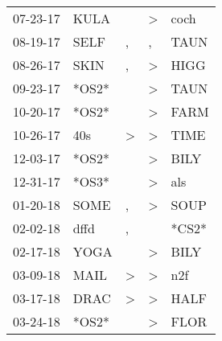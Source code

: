 \begin{supertabular}{p{0.07\textwidth}p{0.06\textwidth}p{0.02\textwidth}p{0.02\textwidth}p{0.06\textwidth}}
          07-23-17\textsuperscript{} &           KULA\textsuperscript{} &                  &     \textgreater &           coch\textsuperscript{} \\
          08-19-17\textsuperscript{} &           SELF\textsuperscript{} &                , &                , &           TAUN\textsuperscript{} \\
          08-26-17\textsuperscript{} &           SKIN\textsuperscript{} &                , &     \textgreater &           HIGG\textsuperscript{} \\
          09-23-17\textsuperscript{} &                            *OS2* &                  &     \textgreater &           TAUN\textsuperscript{} \\
          10-20-17\textsuperscript{} &                            *OS2* &                  &     \textgreater &           FARM\textsuperscript{} \\
          10-26-17\textsuperscript{} &            40s\textsuperscript{} &     \textgreater &     \textgreater &           TIME\textsuperscript{} \\
          12-03-17\textsuperscript{} &                            *OS2* &                  &     \textgreater &           BILY\textsuperscript{} \\
          12-31-17\textsuperscript{} &                            *OS3* &                  &     \textgreater &            als\textsuperscript{} \\
          01-20-18\textsuperscript{} &           SOME\textsuperscript{} &                , &     \textgreater &           SOUP\textsuperscript{} \\
          02-02-18\textsuperscript{} &           dffd\textsuperscript{} &                , &                  &                            *CS2* \\
          02-17-18\textsuperscript{} &           YOGA\textsuperscript{} &                  &     \textgreater &           BILY\textsuperscript{} \\
          03-09-18\textsuperscript{} &           MAIL\textsuperscript{} &     \textgreater &     \textgreater &            n2f\textsuperscript{} \\
          03-17-18\textsuperscript{} &           DRAC\textsuperscript{} &     \textgreater &     \textgreater &           HALF\textsuperscript{} \\
          03-24-18\textsuperscript{} &                            *OS2* &                  &     \textgreater &           FLOR\textsuperscript{} \\

\end{supertabular}
